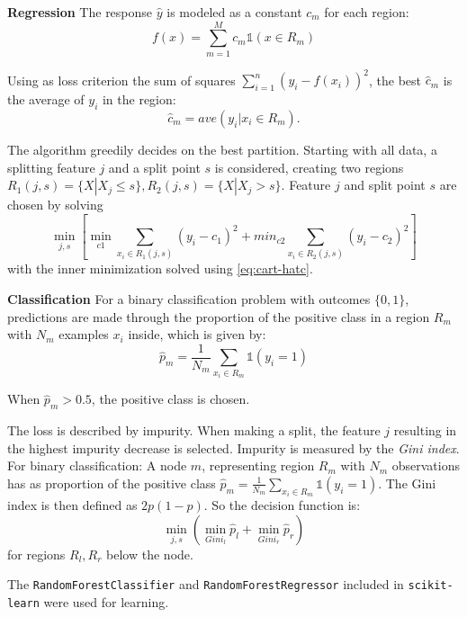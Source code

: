 \documentclass[
  11pt,
  a4paper,
  DIV=12,captions=tableheading,oneside,titlepage]{scrbook}
\begin{document}
\textbf{Regression} The response \(\hat{y}\) is modeled as a constant \(c_m\) for each region: \begin{equation}
f(x) = \sum_{m=1}^M c_m\mathbb{1}(x \in R_m)
\label{eq:cart-const}
\end{equation}

Using as loss criterion the sum of squares \(\sum_{i=1}^n (y_i - f(x_i))^2\), the best \(\hat{c}_m\) is the average of \(y_i\) in the region: \begin{equation}
\hat{c}_m=ave(y_i|x_i \in R_m).
\label{eq:cart-hatc}
\end{equation}

The algorithm greedily decides on the best partition. Starting with all data, a splitting feature \(j\) and a split point \(s\) is considered, creating two regions \(R_1(j,s) = \{X|X_j \leq s\}, R_2(j,s) = \{X|X_j > s\}\). Feature \(j\) and split point \(s\) are chosen by solving \begin{equation}
\min_{j,s}\left[\min_{c1} \sum_{x_i \in R_1(j,s)}(y_i-c_1)^2 + min_{c2} \sum_{x_i \in R_2(j,s)}(y_i-c_2)^2\right]
\label{eq:cart-opt}
\end{equation} with the inner minimization solved using \eqref{eq:cart-hatc}.

\textbf{Classification} For a binary classification problem with outcomes \(\{0,1\}\), predictions are made through the proportion of the positive class in a region \(R_m\) with \(N_m\) examples \(x_i\) inside, which is given by: \begin{equation}
\hat{p}_m = \frac{1}{N_m} \sum_{x_i \in R_m} \mathbb{1}(y_i = 1)
\label{eq:cart-class}
\end{equation}

When \(\hat{p}_m>0.5\), the positive class is chosen.

The loss is described by impurity. When making a split, the feature \(j\) resulting in the highest impurity decrease is selected. Impurity is measured by the \emph{Gini index}. For binary classification: A node \(m\), representing region \(R_m\) with \(N_m\) observations has as proportion of the positive class \(\hat{p}_m = \frac{1}{N_m} \sum_{x_i \in R_m} \mathbb{1}(y_i = 1)\). The Gini index is then defined as \(2p(1-p)\). So the decision function is: \begin{equation}
\min_{j,s}(\min_{Gini_l} \hat{p}_l + \min_{Gini_r} \hat{p}_r)
\label{eq:cart-class-dec}
\end{equation} for regions \(R_l, R_r\) below the node.

The \texttt{RandomForestClassifier} and \texttt{RandomForestRegressor} included in \texttt{scikit-learn} were used for learning.
\end{document}
